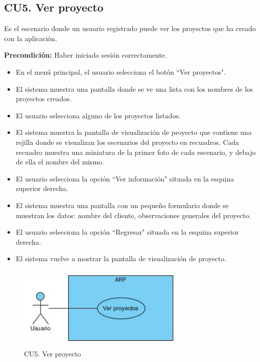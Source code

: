 \newpage
\subsection{CU5. Ver proyecto}\par
Es el escenario donde un usuario registrado puede ver los proyectos que ha creado con la aplicación.\par
\textbf{Precondición:} Haber iniciado sesión correctamente.\par
\begin{itemize}
	\item En el menú principal, el usuario selecciona el botón ``Ver proyectos".
	\item El sistema muestra una pantalla donde se ve una lista con los nombres de los proyectos creados.
	\item El usuario selecciona alguno de los proyectos listados.
	\item El sistema muestra la pantalla de visualización de proyecto que contiene una rejilla donde se visualizan los escenarios del proyecto en recuadros. Cada recuadro muestra una miniatura de la primer foto de cada escenario, y debajo de ella el nombre del mismo.
	\item El usuario selecciona la opción ``Ver información" situada en la esquina superior derecha.
	\item El sistema muestra una pantalla con un pequeño formulario donde se muestran los datos: nombre del cliente, observaciones generales del proyecto.
	\item El usuario selecciona la opción ``Regresar" situada en la esquina superior derecha.
	\item El sistema vuelve a mostrar la pantalla de visualización de proyecto.
\end{itemize}

\begin{figure}[h!]
	\centering
	\includegraphics[width=8cm,height=4cm]{imagenes/analisis/cu/ver_proyectos.jpg}
	\caption{CU5. Ver proyecto}
	\label{fig:verproyecto}
\end{figure} 

